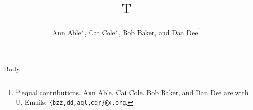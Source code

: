 \documentclass[journal]{IEEEtran}
\begin{document}
\title{T}
\author{Ann Able*, Cat Cole*, Bob Baker, and Dan Dee\thanks{$^{1}$*equal contributions. Ann Able, Cat Cole, Bob Baker, and Dan Dee are with U. Emails: {\tt\small \{bzz,dd,aql,cqr\}@x.org}.}}
\maketitle
Body.
\end{document}
